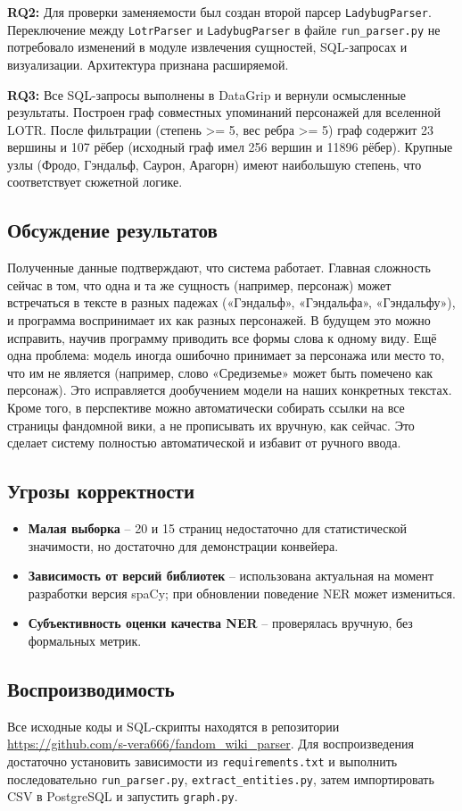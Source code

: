 \textbf{RQ2:} Для проверки заменяемости был создан второй парсер \texttt{LadybugParser}. Переключение между \texttt{LotrParser} и \texttt{LadybugParser} в файле \texttt{run\_parser.py} не потребовало изменений в модуле извлечения сущностей, SQL-запросах и визуализации. Архитектура признана расширяемой.

\textbf{RQ3:} Все SQL-запросы выполнены в DataGrip и вернули осмысленные результаты. Построен граф совместных упоминаний персонажей для вселенной LOTR. После фильтрации (степень >= 5, вес ребра >= 5) граф содержит 23 вершины и 107 рёбер (исходный граф имел 256 вершин и 11896 рёбер). Крупные узлы (Фродо, Гэндальф, Саурон, Арагорн) имеют наибольшую степень, что соответствует сюжетной логике.

\subsection{Обсуждение результатов}

Полученные данные подтверждают, что система работает. Главная сложность сейчас в том, что одна и та же сущность (например, персонаж) может встречаться в тексте в разных падежах («Гэндальф», «Гэндальфа», «Гэндальфу»), и программа воспринимает их как разных персонажей. В будущем это можно исправить, научив программу приводить все формы слова к одному виду. Ещё одна проблема: модель иногда ошибочно принимает за персонажа или место то, что им не является (например, слово «Средиземье» может быть помечено как персонаж). Это исправляется дообучением модели на наших конкретных текстах. Кроме того, в перспективе можно автоматически собирать ссылки на все страницы фандомной вики, а не прописывать их вручную, как сейчас. Это сделает систему полностью автоматической и избавит от ручного ввода.
\subsection{Угрозы корректности}

\begin{itemize}
    \item \textbf{Малая выборка} – 20 и 15 страниц недостаточно для статистической значимости, но достаточно для демонстрации конвейера.
    \item \textbf{Зависимость от версий библиотек} – использована актуальная на момент разработки версия spaCy; при обновлении поведение NER может измениться.
    \item \textbf{Субъективность оценки качества NER} – проверялась вручную, без формальных метрик.
\end{itemize}

\subsection{Воспроизводимость}

Все исходные коды и SQL-скрипты находятся в репозитории \url{https://github.com/s-vera666/fandom_wiki_parser}. Для воспроизведения достаточно установить зависимости из \texttt{requirements.txt} и выполнить последовательно \texttt{run\_parser.py}, \texttt{extract\_entities.py}, затем импортировать CSV в PostgreSQL и запустить \texttt{graph.py}.